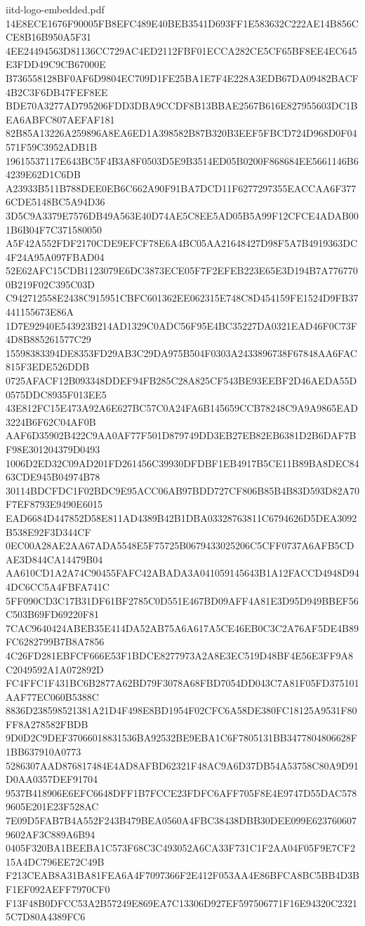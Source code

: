 \begin{filecontents*}[overwrite]{iitd-logo-embedded.pdf}
14E8ECE1676F90005FB8EFC489E40BEB3541D693FF1E583632C222AE14B856CCE8B16B950A5F31
4EE24494563D81136CC729AC4ED2112FBF01ECCA282CE5CF65BF8EE4EC645E3FDD49C9CB67000E
B736558128BF0AF6D9804EC709D1FE25BA1E7F4E228A3EDB67DA09482BACF4B2C3F6DB47FEF8EE
BDE70A3277AD795206FDD3DBA9CCDF8B13BBAE2567B616E827955603DC1BEA6ABFC807AEFAF181
82B85A13226A259896A8EA6ED1A398582B87B320B3EEF5FBCD724D968D0F04571F59C3952ADB1B
19615537117E643BC5F4B3A8F0503D5E9B3514ED05B0200F868684EE5661146B64239E62D1C6DB
A23933B511B788DEE0EB6C662A90F91BA7DCD11F6277297355EACCAA6F3776CDE5148BC5A94D36
3D5C9A3379E7576DB49A563E40D74AE5C8EE5AD05B5A99F12CFCE4ADAB001B6B04F7C371580050
A5F42A552FDF2170CDE9EFCF78E6A4BC05AA21648427D98F5A7B4919363DC4F24A95A097FBAD04
52E62AFC15CDB1123079E6DC3873ECE05F7F2EFEB223E65E3D194B7A7767700B219F02C395C03D
C942712558E2438C915951CBFC601362EE062315E748C8D454159FE1524D9FB37441155673E86A
1D7E92940E543923B214AD1329C0ADC56F95E4BC35227DA0321EAD46F0C73F4D8B885261577C29
15598383394DE8353FD29AB3C29DA975B504F0303A2433896738F67848AA6FAC815F3EDE526DDB
0725AFACF12B093348DDEF94FB285C28A825CF543BE93EEBF2D46AEDA55D0575DDC8935F013EE5
43E812FC15E473A92A6E627BC57C0A24FA6B145659CCB78248C9A9A9865EAD3224B6F62C04AF0B
AAF6D35902B422C9AA0AF77F501D879749DD3EB27EB82EB6381D2B6DAF7BF98E301204379D0493
1006D2ED32C09AD201FD261456C39930DFDBF1EB4917B5CE11B89BA8DEC8463CDE945B04974B78
30114BDCFDC1F02BDC9E95ACC06AB97BDD727CF806B85B4B83D593D82A70F7EF8793E9490E6015
EAD6684D447852D58E811AD4389B42B1DBA03328763811C6794626D5DEA3092B538E92F3D344CF
0EC00A28AE2AA67ADA5548E5F75725B0679433025206C5CFF0737A6AFB5CDAE3D844CA14479B04
AA610CD1A2A74C90455FAFC42ABADA3A041059145643B1A12FACCD4948D944DC6CC5A4FBFA741C
5FF090CD3C17B31DF61BF2785C0D551E467BD09AFF4A81E3D95D949BBEF56C503B69FD69220F81
7CAC9640424ABEB35E414DA52AB75A6A617A5CE46EB0C3C2A76AF5DE4B89FC6282799B7B8A7856
4C26FD281EBFCF666E53F1BDCE8277973A2A8E3EC519D48BF4E56E3FF9A8C2049592A1A072892D
FC4FFC1F431BC6B2877A62BD79F3078A68FBD7054DD043C7A81F05FD375101AAF77EC060B5388C
8836D238598521381A21D4F498E8BD1954F02CFC6A58DE380FC18125A9531F80FF8A278582FBDB
9D0D2C9DEF37066018831536BA92532BE9EBA1C6F7805131BB3477804806628F1BB637910A0773
5286307AAD876817484E4AD8AFBD62321F48AC9A6D37DB54A53758C80A9D91D0AA0357DEF91704
9537B418906E6EFC6648DFF1B7FCCE23FDFC6AFF705F8E4E9747D55DAC5789605E201E23F528AC
7E09D5FAB7B4A552F243B479BEA0560A4FBC38438DBB30DEE099E6237606079602AF3C889A6B94
0405F320BA1BEEBA1C573F68C3C493052A6CA33F731C1F2AA04F05F9E7CF215A4DC796EE72C49B
F213CEAB8A31BA81FEA6A4F7097366F2E412F053AA4E86BFCA8BC5BB4D3BF1EF092AEFF7970CF0
F13F48B0DFCC53A2B57249E869EA7C13306D927EF597506771F16E94320C23215C7D80A4389FC6

\end{filecontents*}
